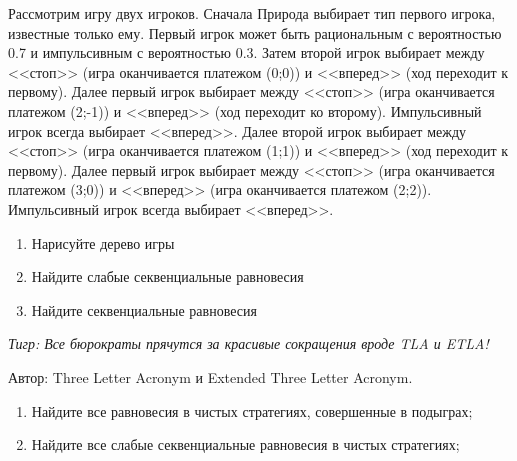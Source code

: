 \begin{problem}

Рассмотрим игру двух игроков. Сначала Природа выбирает тип первого игрока, известные только ему. Первый игрок может быть рациональным с вероятностью 0.7 и импульсивным с вероятностью 0.3. Затем второй игрок выбирает между <<стоп>> (игра оканчивается  платежом (0;0)) и <<вперед>> (ход переходит к первому). Далее первый игрок выбирает между <<стоп>> (игра оканчивается платежом (2;-1)) и <<вперед>> (ход переходит ко второму). Импульсивный игрок всегда выбирает <<вперед>>. Далее второй игрок выбирает между <<стоп>> (игра оканчивается платежом (1;1)) и <<вперед>> (ход переходит к первому). Далее первый игрок выбирает между <<стоп>> (игра оканчивается платежом (3;0)) и <<вперед>> (игра оканчивается платежом (2;2)). Импульсивный игрок всегда выбирает <<вперед>>. \par
\begin{enumerate}
\item Нарисуйте дерево игры \par
\item Найдите слабые секвенциальные равновесия \par
\item  Найдите секвенциальные равновесия \par
\begin{source} 
\cite{lones:dtc}
\end{source}
\end{enumerate}


\begin{sol}

\end{sol}
\end{problem}



\begin{problem}[SPNE=WSE?]
{\it Тигр: Все бюрократы прячутся за красивые сокращения вроде TLA и ETLA!\par}
Автор: Three Letter Acronym и Extended Three Letter Acronym.\par
{}
\begin{enumerate}
\item Найдите все равновесия в чистых стратегиях, совершенные в подыграх;\par
\item  Найдите все слабые секвенциальные равновесия в чистых стратегиях;\par
\end{enumerate}


\begin{sol}

\end{sol}
\end{problem}



